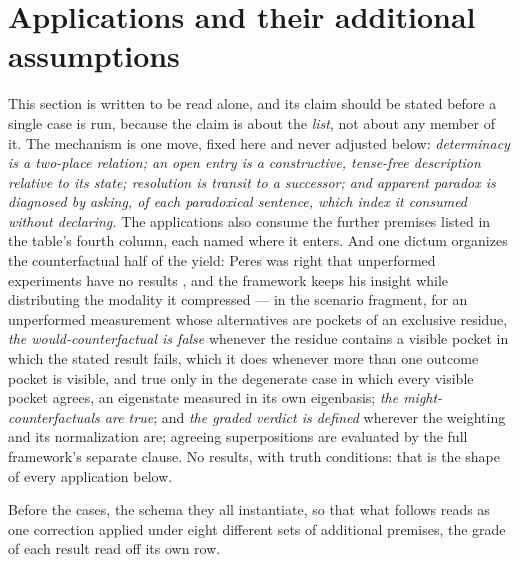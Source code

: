 \section{Applications and their additional assumptions}\label{sec:grid}

This section is written to be read alone, and its claim should be stated before a single case is run, because the claim is about the \emph{list}, not about any member of it. The mechanism is one move, fixed here and never adjusted below: \emph{determinacy is a two-place relation; an open entry is a constructive, tense-free description relative to its state; resolution is transit to a successor; and apparent paradox is diagnosed by asking, of each paradoxical sentence, which index it consumed without declaring.} The applications also consume the further premises listed in the table's fourth column, each named where it enters. And one dictum organizes the counterfactual half of the yield: Peres was right that unperformed experiments have no results \cite{peres1978unperformed}, and the framework keeps his insight while distributing the modality it compressed --- in the scenario fragment, for an unperformed measurement whose alternatives are pockets of an exclusive residue, \emph{the would-counterfactual is false} whenever the residue contains a visible pocket in which the stated result fails, which it does whenever more than one outcome pocket is visible, and true only in the degenerate case in which every visible pocket agrees, an eigenstate measured in its own eigenbasis; \emph{the might-counterfactuals are true}; and \emph{the graded verdict is defined} wherever the weighting and its normalization are; agreeing superpositions are evaluated by the full framework's separate clause. No results, with truth conditions: that is the shape of every application below.

Before the cases, the schema they all instantiate, so that what follows reads as one correction applied under eight different sets of additional premises, the grade of each result read off its own row.

